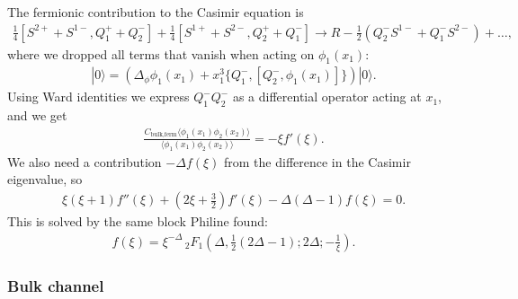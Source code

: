 \documentclass[letterpaper]{article}
\let\Oldsubsubsection\subsubsection
\renewcommand{\subsubsection}{\FloatBarrier\Oldsubsubsection}
\begin{document}
The fermionic contribution to the Casimir equation is
\begin{align}
    \frac14 [ S^{2+} + S^{1-}, Q^+_1 + Q^-_2]
  + \frac14 [ S^{1+} + S^{2-}, Q^+_2 + Q^-_1]
  \to R - \frac{1}{2} \left( 
    Q_2^- S^{1-} + Q_1^- S^{2-}
  \right) + \ldots,
\end{align}
where we dropped all terms that vanish when acting on $\phi_1(x_1)$:
\begin{align}
 [C_{\text{def,ferm}}, \phi_1(x_1)] |0\rangle 
 = \left( \Delta_\phi \phi_1(x_1) + x_1^3 \{ Q_1^-, [Q_2^-, \phi_1(x_1)]\} \right)|0\rangle.
\end{align}
Using Ward identities we express $Q_1^- Q_2^-$ as a differential operator acting at $x_1$, and we get
\begin{align}
 \frac{C_{\text{bulk,ferm}} \langle \phi_1(x_1) \phi_2(x_2) \rangle}
      {\langle \phi_1(x_1) \phi_2(x_2) \rangle}
 = -\xi  f'(\xi).
\end{align}
We also need a contribution $-\Delta f(\xi)$ from the difference in the Casimir eigenvalue, so
\begin{align}
   \xi  (\xi +1) f''(\xi )
 + \left(2 \xi +\frac{3}{2}\right) f'(\xi )
 - \Delta  (\Delta -1)f(\xi )
 = 0.
\end{align}
This is solved by the same block Philine found:
\begin{align}
 f(\xi) 
 = \xi ^{-\Delta } \, _2F_1\left(\Delta ,\frac{1}{2} (2 \Delta -1);2 \Delta ;-\frac{1}{\xi }\right).
\end{align}


\subsubsection{Bulk channel}
\end{document}
